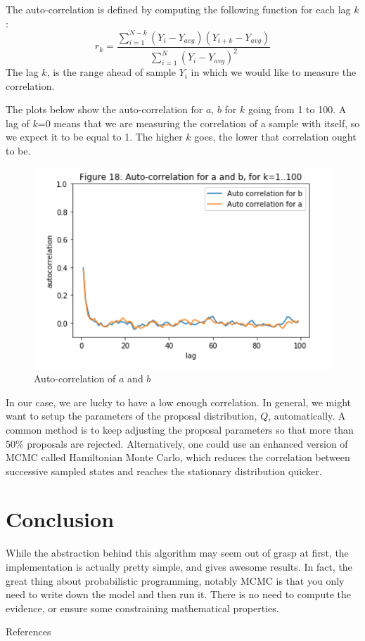 The auto-correlation is defined by computing the following function for each lag $k$:
\begin{equation}r_{k}=\frac{\sum_{i=1}^{N-k}\left(Y_{i}-Y_{a v g}\right)\left(Y_{i+k}-Y_{a v g}\right)}{\sum_{i=1}^{N}\left(Y_{i}-Y_{a v g}\right)^{2}}\end{equation}
The lag $k$, is  the range ahead of sample  $Y_i$ in which we would like to measure the correlation.

The plots below show the auto-correlation for $a$, $b$ for $k$ going from 1 to 100. A lag of $k$=0 means that we are measuring the correlation of a sample with itself, so we expect it to be equal to 1. The higher $k$ goes, the lower that correlation ought to be.
\begin{figure}[h]
    \centering
\includegraphics[width=.8\textwidth]{pic/p05c08-snip16}
    \caption{Auto-correlation of $a$ and $b$}
    \label{fig:p05c08-snip16}
\end{figure}
In our case, we are lucky to have a low enough correlation. In general, we might want to setup the parameters of the proposal distribution, $Q$, automatically. A common method is to keep adjusting the proposal parameters so that more than 50\% proposals are rejected. Alternatively, one could use an enhanced version of MCMC called Hamiltonian Monte Carlo, which reduces the correlation between successive sampled states and reaches the stationary distribution quicker.

\section{Conclusion}
While the abstraction behind this algorithm may seem out of grasp at first, the implementation is actually pretty simple, and gives awesome results. In fact, the great thing about probabilistic programming, notably MCMC is that you only need to write down the model and then run it. There is no need to compute the evidence, or ensure some constraining mathematical properties.

References \cite{PeterDriscoll2006,CarsonChow2010,GirolamiRogers2017}

